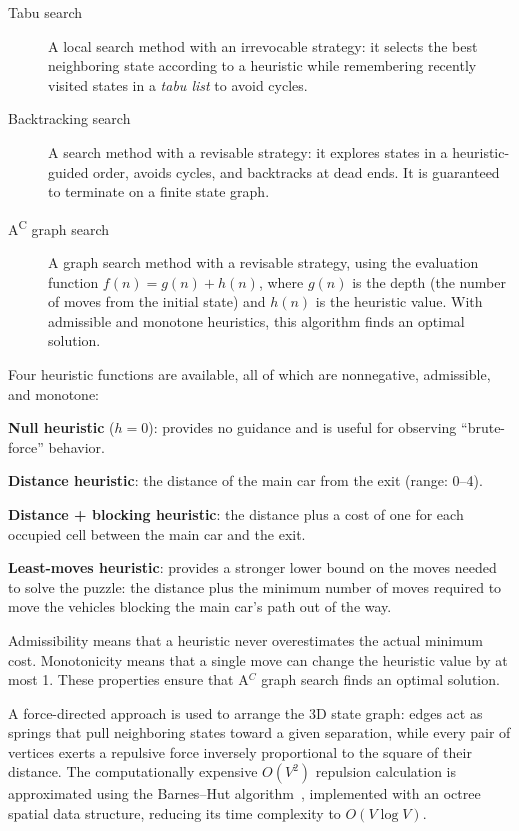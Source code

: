 \begin{description}
    \item[Tabu search] A local search method with an irrevocable strategy: it selects the best neighboring state according to a heuristic while remembering recently visited states in a \emph{tabu list} to avoid cycles.
    \item[Backtracking search] A search method with a revisable strategy: it explores states in a heuristic-guided order, avoids cycles, and backtracks at dead ends. It is guaranteed to terminate on a finite state graph.
    \item[A\textsuperscript{C} graph search] A graph search method with a revisable strategy, using the evaluation function $f(n) = g(n) + h(n)$, where $g(n)$ is the depth (the number of moves from the initial state) and $h(n)$ is the heuristic value. With admissible and monotone heuristics, this algorithm finds an optimal solution.
\end{description}

Four heuristic functions are available, all of which are nonnegative, admissible, and monotone:~\cite[pp.~14--15]{gregorics_grafker}
\begin{compactitem}
    \item \textbf{Null heuristic} ($h = 0$): provides no guidance and is useful for observing \enquote{brute-force} behavior.
    \item \textbf{Distance heuristic}: the distance of the main car from the exit (range: 0--4).
    \item \textbf{Distance + blocking heuristic}: the distance plus a cost of one for each occupied cell between the main car and the exit.
    \item \textbf{Least-moves heuristic}: provides a stronger lower bound on the moves needed to solve the puzzle: the distance plus the minimum number of moves required to move the vehicles blocking the main car's path out of the way.
\end{compactitem}

Admissibility means that a heuristic never overestimates the actual minimum cost. Monotonicity means that a single move can change the heuristic value by at most 1. These properties ensure that A$^C$ graph search finds an optimal solution.~\cite[p.~16]{gregorics_grafker}

A force-directed approach is used to arrange the 3D state graph: edges act as springs that pull neighboring states toward a given separation, while every pair of vertices exerts a repulsive force inversely proportional to the square of their distance. The computationally expensive $O(V^2)$ repulsion calculation is approximated using the Barnes--Hut algorithm~\cite{barneshut1986}, implemented with an octree spatial data structure, reducing its time complexity to $O(V \log V)$.

